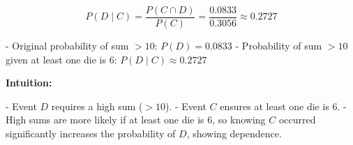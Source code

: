 \documentclass[12pt]{article}
\begin{document}
\[
P(D \mid C) = \frac{P(C \cap D)}{P(C)} = \frac{0.0833}{0.3056} \approx 0.2727
\]

- Original probability of sum $>10$: \(P(D) = 0.0833\)  
- Probability of sum $>10$ given at least one die is 6: \(P(D \mid C) \approx 0.2727\)

\textbf{Intuition:}  

- Event \(D\) requires a high sum ($>10$).  
- Event \(C\) ensures at least one die is 6.  
- High sums are more likely if at least one die is 6, so knowing \(C\) occurred significantly increases the probability of \(D\), showing dependence.
\end{document}
